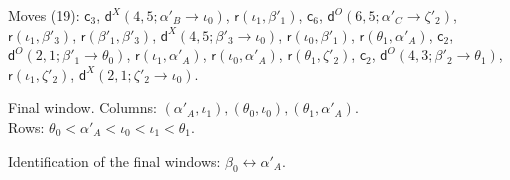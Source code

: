 \documentclass[11pt]{amsart}
\theoremstyle{definition}
\theoremstyle{remark}
\begin{document}
\noindent Moves (19): $\mathsf{c}_{3}$, $\mathsf{d}^{X}(4,5;\alpha'_B\to\iota_0)$, $\mathsf{r}(\iota_1,\beta'_1)$, $\mathsf{c}_{6}$, $\mathsf{d}^{O}(6,5;\alpha'_C\to\zeta'_2)$, $\mathsf{r}(\iota_1,\beta'_3)$, $\mathsf{r}(\beta'_1,\beta'_3)$, $\mathsf{d}^{X}(4,5;\beta'_3\to\iota_0)$, $\mathsf{r}(\iota_0,\beta'_1)$, $\mathsf{r}(\theta_1,\alpha'_A)$, $\mathsf{c}_{2}$, $\mathsf{d}^{O}(2,1;\beta'_1\to\theta_0)$, $\mathsf{r}(\iota_1,\alpha'_A)$, $\mathsf{r}(\iota_0,\alpha'_A)$, $\mathsf{r}(\theta_1,\zeta'_2)$, $\mathsf{c}_{2}$, $\mathsf{d}^{O}(4,3;\beta'_2\to\theta_1)$, $\mathsf{r}(\iota_1,\zeta'_2)$, $\mathsf{d}^{X}(2,1;\zeta'_2\to\iota_0)$.\par
\noindent Final window. Columns: $(\alpha'_A,\iota_1),\allowbreak (\theta_0,\iota_0),\allowbreak (\theta_1,\alpha'_A)$.\\ Rows: $\theta_0 <\allowbreak \alpha'_A <\allowbreak \iota_0 <\allowbreak \iota_1 <\allowbreak \theta_1$.\par\medskip
\noindent Identification of the final windows: $\beta_0\leftrightarrow \alpha'_A$.\par\bigskip
\end{document}
